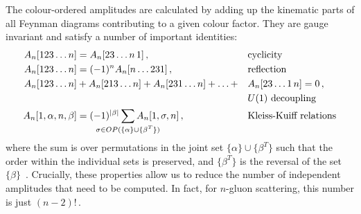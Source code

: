 \documentclass[main.tex]{subfiles}
\begin{document}
The colour-ordered amplitudes are calculated by adding up the kinematic parts of all Feynman diagrams contributing to a given colour factor. They are gauge invariant and satisfy a number of important identities:
\begin{align}
    A_n[123\ldots n] &= A_n[23\ldots n\,1]\,, && \text{cyclicity} \\
    A_n[123\ldots n] &= (-1)^n A_n[n \ldots 231] \,, && \text{reflection} \\
    A_n[123 \ldots n] &+ A_n[213 \ldots n] +  A_n[231 \ldots n] +  \ldots + && A_n[23 \ldots 1\,n]  = 0 \,, \nonumber \\ 
    & && U(1) \text{ decoupling} \\
    A_n[1, {\alpha}, n, {\beta}] &= (-1)^{|\beta|} \sum_{\mathclap{\sigma \in OP(\{\alpha\} \cup \{\beta^T\})}} A_n[1, \sigma, n] \,, && \text{Kleiss-Kuiff relations}
\end{align}
 where the sum is over permutations in the joint set $\{\alpha\} \cup \{\beta^T\}$ such that the order within the individual sets is preserved, and $\{\beta^T\}$ is the reversal of the set $\{\beta\}$~\cite{Mangano:1990by, Kleiss:1989616, Bern:2008qj}. Crucially, these properties allow us to reduce the number of independent amplitudes that need to be computed. In fact, for $n$-gluon scattering, this number is just $(n-2)!$\,.
\end{document}
